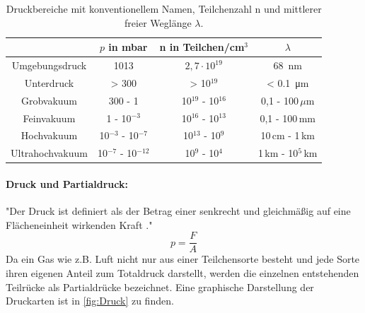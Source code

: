 \begin{table}
  \centering
  \caption{Druckbereiche mit konventionellem Namen, Teilchenzahl n und mittlerer freier Weglänge $\lambda$.}
  \label{tab:Vakuum}
  \begin{tabular}{cccc}
    \toprule
    &$p$ in mbar & n in Teilchen/cm$^3$ & $\lambda$ \\
    \midrule
    Umgebungsdruck & 1013 & $2,7\cdot10^{19}$ & \SI{68}{\nano\meter} \\
    Unterdruck & > 300 & > 10$^{19}$ & < \SI{0.1}{\micro\meter} \\
    Grobvakuum & 300 - 1 & 10$^{19}$ - 10$^{16}$ & 0,1 - 100$\,\mu$m \\
    Feinvakuum & 1 - 10$^{-3}$ & 10$^{16}$ - 10$^{13}$ & 0,1 - 100$\,$mm \\
    Hochvakuum & 10$^{-3}$ - 10$^{-7}$ & 10$^{13}$ - 10$^{9}$ & 10$\,$cm - 1$\,$km \\
    Ultrahochvakuum & 10$^{-7}$ - 10$^{-12}$ & 10$^{9}$ - 10$^{4}$ & 1$\,$km - 10$^5\,$km \\
  \end{tabular}
\end{table}

\paragraph{Druck und Partialdruck:}
"Der Druck ist definiert als der Betrag einer senkrecht und gleichmäßig auf eine Flächeneinheit wirkenden Kraft \cite{pfeiffer}."
\begin{equation}
  p = \frac{F}{A}
\end{equation}
Da ein Gas wie z.B. Luft nicht nur aus einer Teilchensorte besteht und jede Sorte ihren eigenen Anteil zum Totaldruck darstellt, werden
die einzelnen entstehenden Teilrücke als Partialdrücke bezeichnet. Eine graphische Darstellung der Druckarten ist in \ref{fig:Druck} zu finden.

